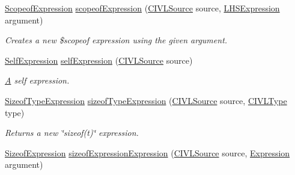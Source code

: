 \begin{DoxyCompactItemize}
\hyperlink{interfaceedu_1_1udel_1_1cis_1_1vsl_1_1civl_1_1model_1_1IF_1_1expression_1_1ScopeofExpression}{Scopeof\+Expression} \hyperlink{interfaceedu_1_1udel_1_1cis_1_1vsl_1_1civl_1_1model_1_1IF_1_1ModelFactory_ada4f47f47a770847b14565b3a665ef0c}{scopeof\+Expression} (\hyperlink{interfaceedu_1_1udel_1_1cis_1_1vsl_1_1civl_1_1model_1_1IF_1_1CIVLSource}{C\+I\+V\+L\+Source} source, \hyperlink{interfaceedu_1_1udel_1_1cis_1_1vsl_1_1civl_1_1model_1_1IF_1_1expression_1_1LHSExpression}{L\+H\+S\+Expression} argument)
\begin{DoxyCompactList}\small\item\em Creates a new \$scopeof expression using the given argument. \end{DoxyCompactList}\item 
\hyperlink{interfaceedu_1_1udel_1_1cis_1_1vsl_1_1civl_1_1model_1_1IF_1_1expression_1_1SelfExpression}{Self\+Expression} \hyperlink{interfaceedu_1_1udel_1_1cis_1_1vsl_1_1civl_1_1model_1_1IF_1_1ModelFactory_a59aeec5a613c7817a926d5380edac30a}{self\+Expression} (\hyperlink{interfaceedu_1_1udel_1_1cis_1_1vsl_1_1civl_1_1model_1_1IF_1_1CIVLSource}{C\+I\+V\+L\+Source} source)
\begin{DoxyCompactList}\small\item\em \hyperlink{structA}{A} self expression. \end{DoxyCompactList}\item 
\hyperlink{interfaceedu_1_1udel_1_1cis_1_1vsl_1_1civl_1_1model_1_1IF_1_1expression_1_1SizeofTypeExpression}{Sizeof\+Type\+Expression} \hyperlink{interfaceedu_1_1udel_1_1cis_1_1vsl_1_1civl_1_1model_1_1IF_1_1ModelFactory_a0f4033fd9d5d38e88315fe2875b20033}{sizeof\+Type\+Expression} (\hyperlink{interfaceedu_1_1udel_1_1cis_1_1vsl_1_1civl_1_1model_1_1IF_1_1CIVLSource}{C\+I\+V\+L\+Source} source, \hyperlink{interfaceedu_1_1udel_1_1cis_1_1vsl_1_1civl_1_1model_1_1IF_1_1type_1_1CIVLType}{C\+I\+V\+L\+Type} type)
\begin{DoxyCompactList}\small\item\em Returns a new \char`\"{}sizeof(t)\char`\"{} expression. \end{DoxyCompactList}\item 
\hyperlink{interfaceedu_1_1udel_1_1cis_1_1vsl_1_1civl_1_1model_1_1IF_1_1expression_1_1SizeofExpression}{Sizeof\+Expression} \hyperlink{interfaceedu_1_1udel_1_1cis_1_1vsl_1_1civl_1_1model_1_1IF_1_1ModelFactory_a5d81a93caa811748e8839845bccc4638}{sizeof\+Expression\+Expression} (\hyperlink{interfaceedu_1_1udel_1_1cis_1_1vsl_1_1civl_1_1model_1_1IF_1_1CIVLSource}{C\+I\+V\+L\+Source} source, \hyperlink{interfaceedu_1_1udel_1_1cis_1_1vsl_1_1civl_1_1model_1_1IF_1_1expression_1_1Expression}{Expression} argument)

\end{DoxyCompactItemize}
